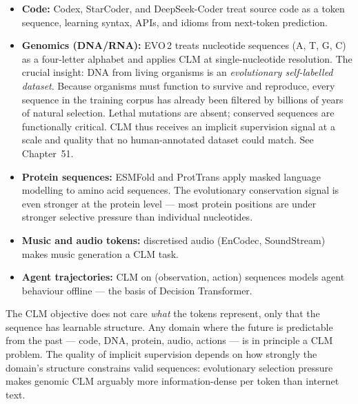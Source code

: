 \begin{itemize}
  \item \textbf{Code:} Codex, StarCoder, and DeepSeek-Coder treat source code as a
    token sequence, learning syntax, APIs, and idioms from next-token prediction.

  \item \textbf{Genomics (DNA/RNA):} EVO\,2 treats nucleotide sequences (A, T, G, C)
    as a four-letter alphabet and applies CLM at single-nucleotide resolution.
    The crucial insight: DNA from living organisms is an
    \emph{evolutionary self-labelled dataset}. Because organisms must function to
    survive and reproduce, every sequence in the training corpus has already been
    filtered by billions of years of natural selection. Lethal mutations are absent;
    conserved sequences are functionally critical. CLM thus receives an implicit
    supervision signal at a scale and quality that no human-annotated dataset could
    match. See Chapter~51.

  \item \textbf{Protein sequences:} ESMFold and ProtTrans apply masked language
    modelling to amino acid sequences. The evolutionary conservation signal is even
    stronger at the protein level --- most protein positions are under stronger
    selective pressure than individual nucleotides.

  \item \textbf{Music and audio tokens:} discretised audio (EnCodec, SoundStream)
    makes music generation a CLM task.

  \item \textbf{Agent trajectories:} CLM on (observation, action) sequences models
    agent behaviour offline --- the basis of Decision Transformer.
\end{itemize}

\begin{intuitionbox}
  The CLM objective does not care \emph{what} the tokens represent, only that the
  sequence has learnable structure. Any domain where the future is predictable from
  the past --- code, DNA, protein, audio, actions --- is in principle a CLM problem.
  The quality of implicit supervision depends on how strongly the domain's structure
  constrains valid sequences: evolutionary selection pressure makes genomic CLM
  arguably more information-dense per token than internet text.
\end{intuitionbox}

